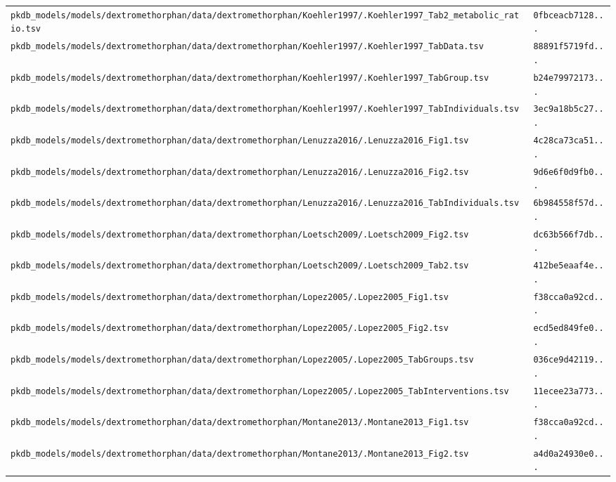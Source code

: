 \documentclass{article}
\begin{document}
\begin{longtable}{ll}
\texttt{pkdb\_models/models/dextromethorphan/data/dextromethorphan/Koehler1997/.Koehler1997\_Tab2\_metabolic\_ratio.tsv} & \texttt{0fbceacb7128...} \\
\texttt{pkdb\_models/models/dextromethorphan/data/dextromethorphan/Koehler1997/.Koehler1997\_TabData.tsv} & \texttt{88891f5719fd...} \\
\texttt{pkdb\_models/models/dextromethorphan/data/dextromethorphan/Koehler1997/.Koehler1997\_TabGroup.tsv} & \texttt{b24e79972173...} \\
\texttt{pkdb\_models/models/dextromethorphan/data/dextromethorphan/Koehler1997/.Koehler1997\_TabIndividuals.tsv} & \texttt{3ec9a18b5c27...} \\
\texttt{pkdb\_models/models/dextromethorphan/data/dextromethorphan/Lenuzza2016/.Lenuzza2016\_Fig1.tsv} & \texttt{4c28ca73ca51...} \\
\texttt{pkdb\_models/models/dextromethorphan/data/dextromethorphan/Lenuzza2016/.Lenuzza2016\_Fig2.tsv} & \texttt{9d6e6f0d9fb0...} \\
\texttt{pkdb\_models/models/dextromethorphan/data/dextromethorphan/Lenuzza2016/.Lenuzza2016\_TabIndividuals.tsv} & \texttt{6b984558f57d...} \\
\texttt{pkdb\_models/models/dextromethorphan/data/dextromethorphan/Loetsch2009/.Loetsch2009\_Fig2.tsv} & \texttt{dc63b566f7db...} \\
\texttt{pkdb\_models/models/dextromethorphan/data/dextromethorphan/Loetsch2009/.Loetsch2009\_Tab2.tsv} & \texttt{412be5eaaf4e...} \\
\texttt{pkdb\_models/models/dextromethorphan/data/dextromethorphan/Lopez2005/.Lopez2005\_Fig1.tsv} & \texttt{f38cca0a92cd...} \\
\texttt{pkdb\_models/models/dextromethorphan/data/dextromethorphan/Lopez2005/.Lopez2005\_Fig2.tsv} & \texttt{ecd5ed849fe0...} \\
\texttt{pkdb\_models/models/dextromethorphan/data/dextromethorphan/Lopez2005/.Lopez2005\_TabGroups.tsv} & \texttt{036ce9d42119...} \\
\texttt{pkdb\_models/models/dextromethorphan/data/dextromethorphan/Lopez2005/.Lopez2005\_TabInterventions.tsv} & \texttt{11ecee23a773...} \\
\texttt{pkdb\_models/models/dextromethorphan/data/dextromethorphan/Montane2013/.Montane2013\_Fig1.tsv} & \texttt{f38cca0a92cd...} \\
\texttt{pkdb\_models/models/dextromethorphan/data/dextromethorphan/Montane2013/.Montane2013\_Fig2.tsv} & \texttt{a4d0a24930e0...} \\

\end{longtable}
\end{document}
